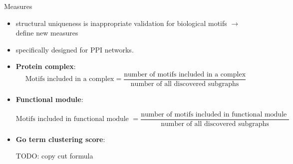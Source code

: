 \documentclass[8pt]{beamer}
\begin{document}
\begin{frame}{Measures}


\begin{itemize}

\item structural uniqueness is inappropriate validation for biological motifs $\rightarrow$ define new measures

\item specifically designed for PPI networks.

\end{itemize}


\begin{itemize}

	\item \textbf{Protein complex}: \\

		$$\text{Motifs included in a complex} = \dfrac{\text{number of motifs included in a complex}}		{\text{number of all discovered subgraphs}}$$

	\begin{small}


	\end{small}

	\item \textbf{Functional module}: \\

	\begin{small}

			$$\text{Motifs included in functional module } = \dfrac{\text{number of motifs included in functional module }}{\text{number of all discovered subgraphs}}$$

	\end{small}


	\item \textbf{Go term clustering score}:  

		\begin{small}

	\end{small}




TODO: copy cut formula

	

\end{itemize}


\end{frame}
\end{document}
